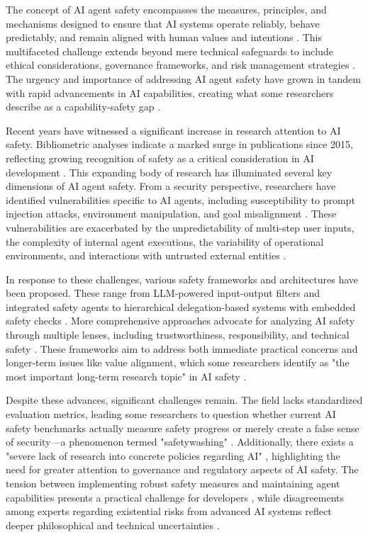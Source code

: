 \documentclass[conference]{IEEEtran}
\begin{document}
The concept of AI agent safety encompasses the measures, principles, and mechanisms designed to ensure that AI systems operate reliably, behave predictably, and remain aligned with human values and intentions \cite{2408.12935}. This multifaceted challenge extends beyond mere technical safeguards to include ethical considerations, governance frameworks, and risk management strategies \cite{2405.19524}. The urgency and importance of addressing AI agent safety have grown in tandem with rapid advancements in AI capabilities, creating what some researchers describe as a capability-safety gap \cite{2401.10899, 2502.14870}.

Recent years have witnessed a significant increase in research attention to AI safety. Bibliometric analyses indicate a marked surge in publications since 2015, reflecting growing recognition of safety as a critical consideration in AI development \cite{2002.05671}. This expanding body of research has illuminated several key dimensions of AI agent safety. From a security perspective, researchers have identified vulnerabilities specific to AI agents, including susceptibility to prompt injection attacks, environment manipulation, and goal misalignment \cite{2406.08689, 2410.14728}. These vulnerabilities are exacerbated by the unpredictability of multi-step user inputs, the complexity of internal agent executions, the variability of operational environments, and interactions with untrusted external entities \cite{2406.02630}.

In response to these challenges, various safety frameworks and architectures have been proposed. These range from LLM-powered input-output filters and integrated safety agents to hierarchical delegation-based systems with embedded safety checks \cite{2409.03793}. More comprehensive approaches advocate for analyzing AI safety through multiple lenses, including trustworthiness, responsibility, and technical safety \cite{2408.12935, 2411.12275}. These frameworks aim to address both immediate practical concerns and longer-term issues like value alignment, which some researchers identify as "the most important long-term research topic" in AI safety \cite{2002.05671}.

Despite these advances, significant challenges remain. The field lacks standardized evaluation metrics, leading some researchers to question whether current AI safety benchmarks actually measure safety progress or merely create a false sense of security—a phenomenon termed "safetywashing" \cite{2407.21792}. Additionally, there exists a "severe lack of research into concrete policies regarding AI" \cite{2002.05671}, highlighting the need for greater attention to governance and regulatory aspects of AI safety. The tension between implementing robust safety measures and maintaining agent capabilities presents a practical challenge for developers \cite{2409.03793}, while disagreements among experts regarding existential risks from advanced AI systems reflect deeper philosophical and technical uncertainties \cite{2502.14870}.
\end{document}
